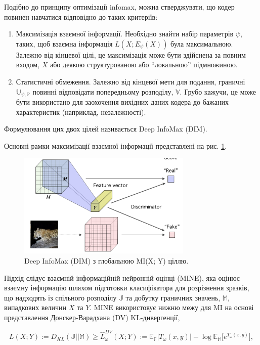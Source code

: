 Подібно до принципу оптимізації infomax, можна стверджувати, що кодер повинен навчатися відповідно до таких критеріїв:

\begin{enumerate}
	\item Максимізація взаємної інформації. Необхідно знайти набір параметрів $\psi$, таких, щоб взаємна інформація $L(X; E_{\psi} (X))$ була максимальною. Залежно від кінцевої цілі, це максимізація може бути здійснена за повним входом, $X$ або деякою структурованою або “локальною” підмножиною.
	\item Статистичні обмеження. Залежно від кінцевої мети для подання, граничні $\mathbb{U}_{\psi, \mathbb{P}}$ повинні відповідати попередньому розподілу, $\mathbb{V}$. Грубо кажучи, це може бути використано для заохочення вихідних даних кодера до бажаних характеристик (наприклад, незалежності).
\end{enumerate}

Формулювання цих двох цілей називається Deep InfoMax (DIM).

Основні рамки максимізації взаємної інформації представлені на рис. \ref{fig:deepinfo2}. 

\vspace{1em}

\begin{figure}[h]
  \includegraphics[width=\textwidth, height=5cm, natwidth=266, natheight=160]{Mal/deepinfo2.jpg}
  \caption{Deep InfoMax (DIM) з глобальною MI(X; Y) ціллю.}
  \label{fig:deepinfo2}
\end{figure}

Підхід слідує взаємній інформаційній нейронній оцінці (MINE), яка оцінює взаємну інформацію шляхом підготовки класифікатора для розрізнення зразків, що надходять із спільного розподілу $\mathbb{J}$ та добутку граничних значень, $\mathbb{M}$, випадкових величин $X$ та $Y$. MINE використовує нижню межу для MI на основі представлення Донскер-Варадхана (DV) KL-дивергенції,

\begin{equation}\label{eq:dv}
L(X; Y) := D_{KL}(\mathbb{J}||\mathbb{M}) \ge \hat{L}_{\omega}^{DV}(X;Y):=\mathbb{E}_{\mathbb{F}}|T_{\omega}(x,y)| - \log{\mathbb{E}_{\mathbb{M}}[e^{T_{\omega}(x,y)}}],
\end{equation}


